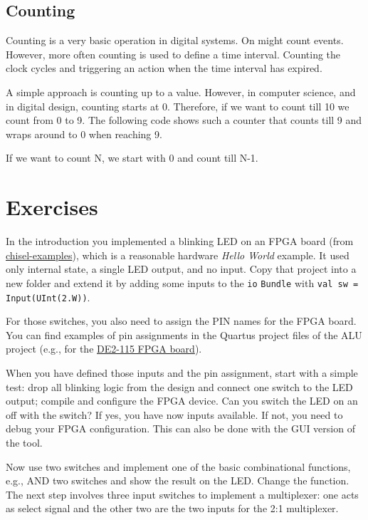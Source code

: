 \documentclass[%
    10pt, %
    headinclude, footexclude,
    openright, %
    notitlepage,
    cleardoubleempty,
    headsepline,
    pointlessnumbers,
    bibtotoc, idxtotoc,
    ]{scrbook}
\newcommand{\code}[1]{{\small{\texttt{#1}}}}
\newcommand{\myref}[2]{\href{#1}{#2}}
\begin{document}
\subsection{Counting}

Counting is a very basic operation in digital systems. On might count events.
However, more often counting is used to define a time interval. Counting the
clock cycles and triggering an action when the time interval has expired.

A simple approach is counting up to a value. However, in computer science,
and in digital design, counting starts at 0. Therefore, if we want to count till
10 we count from 0 to 9. The following code shows such a counter that counts
till 9 and wraps around to 0 when reaching 9.

If we want to count N, we start with 0 and count till N-1.







\section{Exercises}

In the introduction you implemented a blinking LED on an FPGA board
(from \myref{https://github.com/schoeberl/chisel-examples}{chisel-examples}), which is a reasonable
hardware \emph{Hello World} example. It used only internal state, a single LED output, and no input.
Copy that project into a new folder and extend it by adding some inputs to the \code{io} \code{Bundle}
with \code{val sw = Input(UInt(2.W))}.



\noindent For those switches, you also need to assign the PIN names for the FPGA board.
You can find examples of pin assignments in the Quartus project files of the ALU project
(e.g., for the \myref{https://github.com/schoeberl/chisel-examples/blob/master/quartus/altde2-115/alu.qsf}{DE2-115
FPGA board}).

When you have defined those inputs and the pin assignment, start with a simple test:
drop all blinking logic from the design and connect one switch to the LED output;
compile and configure the FPGA device. Can you switch the LED on an off with the switch?
If yes, you have now inputs available. If not, you need to debug your FPGA configuration.
This can also be done with the GUI version of the tool.

Now use two switches and implement one of the basic combinational functions,
e.g., AND two switches and show the result on the LED. Change the function.
The next step involves three input switches to implement a multiplexer: one acts as
select signal and the other two are the two inputs for the 2:1 multiplexer.
\end{document}
